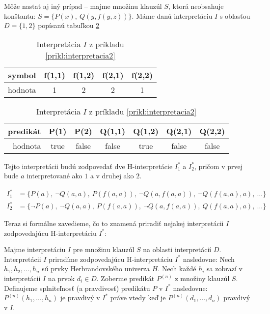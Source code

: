 \begin{priklad}
    \label{prikl:interpretacia2}
    Môže nastať aj iný prípad -- majme množinu klauzúl $S$, ktorá neobsahuje
    konštantu: $S=\{P(x),\ Q(y,f(y,z)) \}$.
    Máme danú interpretáciu $I$ s oblasťou $D=\{1,2\}$ popísanú
    tabuľkou \ref{tab:prikl-interpretacia2}

    \begin{table}[h]
        \centering
        \begin{tabular}{|r||c|c|c|c|}
            \hline
            symbol & f(1,1) & f(1,2) & f(2,1) & f(2,2) \\
            \hline
            hodnota  & 1 & 2 & 2 & 1 \\
            \hline
        \end{tabular}
        
        \medskip
        \begin{tabular}{|r||c|c|c|c|c|c|}
            \hline
            predikát & P(1) & P(2) & Q(1,1) & Q(1,2) & Q(2,1) & Q(2,2) \\
            \hline
            hodnota & true & false & false & true & false & false \\
            \hline
        \end{tabular}
        \caption{Interpretácia $I$ z príkladu
          \ref{prikl:interpretacia2}}
        \label{tab:prikl-interpretacia2}
    \end{table}
   
    Tejto interpretácii budú zodpovedať dve H-interpretácie
    $I_1^*$ a $I_2^*$, pričom v prvej bude $a$ interpretované ako $1$ 
    a v druhej ako $2$.

    \begin{align*}
        I_1^* &= \{ P(a),\ \neg Q(a,a),\ P(f(a,a)),\ \neg Q(a,f(a,a)),\
            \neg Q(f(a,a),a),\ \dots \} \\
        I_2^* &= \{ \neg P(a),\ \neg Q(a,a),\ P(f(a,a)),\ \neg Q(a,f(a,a)),\
            Q(f(a,a),a),\ \dots \}
    \end{align*}
\end{priklad}

Teraz si formálne zavedieme, čo to znamená priradiť nejakej interpretácii $I$
zodpovedajúcu H-interpretáciu $I^*$:

\begin{definicia}
    Majme interpretáciu $I$ pre množinu klauzúl $S$ na oblasti
    interpretácií $D$. Interpretácii $I$ priradíme zodpovedajúcu
    H-interpretáciu $I^*$ nasledovne:
    Nech $h_1, h_2, \ldots, h_n$ sú prvky Herbrandovského univerza
    $H$.
    Nech každé $h_i$ sa zobrazí v interpretácii $I$ na prvok
    $d_i \in D$.
    Zoberme predikát $P^{(n)}$ z množiny klauzúl $S$.
    Definujeme splniteľnosť (a pravdivosť) predikátu $P$ v $I^*$
    nasledovne:
    $P^{(n)}(h_1,\dots,h_n)$ je pravdivý v $I^*$ práve vtedy keď je
    $P^{(n)}(d_1,\dots,d_n)$ pravdivý v $I$.
\end{definicia}

